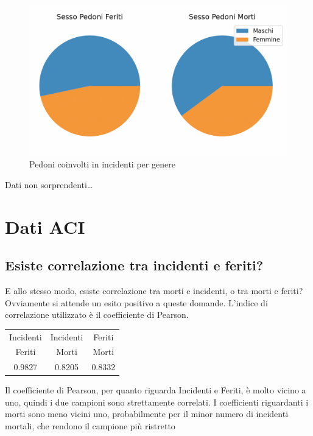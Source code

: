 \documentclass[a4paper]{report}
\begin{document}
\begin{figure}
    \includegraphics[width=\linewidth]{../src/incidenti/incidenti_senza_coords/pedoni/sesso_morti_feriti.png}
    \caption{Pedoni coinvolti in incidenti per genere}
    \label{fig:sesso_morti_feriti}
\end{figure}

Dati non sorprendenti\dots





\section{Dati ACI}

\subsection{Esiste correlazione tra incidenti e feriti?}

E allo stesso modo, esiste correlazione tra morti e incidenti, o tra morti e feriti?\\
Ovviamente si attende un esito positivo a queste domande.
L'indice di correlazione utilizzato è il coefficiente di Pearson.
\begin{center}
    \begin{tabular}{ |c|c|c| } 
    \hline
    Incidenti & Incidenti & Feriti \\ 
    Feriti & Morti & Morti \\ 
    \hline
    0.9827 & 0.8205 & 0.8332 \\ 
    \hline
    \end{tabular}
\end{center}

Il coefficiente di Pearson, per quanto riguarda Incidenti e Feriti, 
è molto vicino a uno, quindi i due campioni sono strettamente correlati.
I coefficienti riguardanti i morti sono meno vicini uno, probabilmente per il minor numero 
di incidenti mortali, che rendono il campione più ristretto
\end{document}
